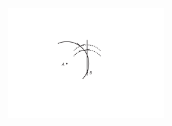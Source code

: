 \pend
\vspace*{2.5em}
\pstart
\centering
\noindent
\includegraphics[width=0.31\textwidth]{images/LH03705_216v-d2.pdf}\\
\pend
\count{}
\count{}
\count{}